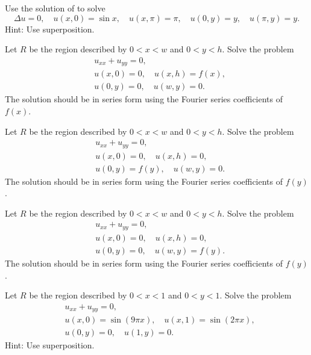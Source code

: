 \begin{exercise}
Use the solution of  to solve
\begin{equation*}
\Delta u = 0,
\quad u(x,0) = \sin x,
\quad u(x,\pi) = \pi,
\quad u(0,y) = y,
\quad u(\pi,y) = y .
\end{equation*}
Hint: Use superposition.
\end{exercise}

\begin{exercise}
Let $R$ be the region described by $0 < x < w$ and $0 < y < h$.
Solve the problem
\begin{align*}
& u_{xx} + u_{yy} = 0, \\
& u(x,0) = 0, \quad u(x,h) = f(x), \\
& u(0,y) = 0, \quad u(w,y) = 0.
\end{align*}
The solution should be in series form using the Fourier series coefficients
of $f(x)$.
\end{exercise}

\begin{exercise}
Let $R$ be the region described by $0 < x < w$ and $0 < y < h$.
Solve the problem
\begin{align*}
& u_{xx} + u_{yy} = 0, \\
& u(x,0) = 0, \quad u(x,h) = 0, \\
& u(0,y) = f(y), \quad u(w,y) = 0.
\end{align*}
The solution should be in series form using the Fourier series coefficients
of $f(y)$.
\end{exercise}

\begin{exercise}
Let $R$ be the region described by $0 < x < w$ and $0 < y < h$.
Solve the problem
\begin{align*}
& u_{xx} + u_{yy} = 0, \\
& u(x,0) = 0, \quad u(x,h) = 0, \\
& u(0,y) = 0, \quad u(w,y) = f(y).
\end{align*}
The solution should be in series form using the Fourier series coefficients
of $f(y)$.
\end{exercise}

\begin{exercise}
Let $R$ be the region described by $0 < x < 1$ and $0 < y < 1$.
Solve the problem
\begin{align*}
& u_{xx} + u_{yy} = 0, \\
& u(x,0) = \sin (9 \pi x), \quad u(x,1) = \sin (2 \pi x), \\
& u(0,y) = 0, \quad u(1,y) = 0 .
\end{align*}
Hint: Use superposition.
\end{exercise}

